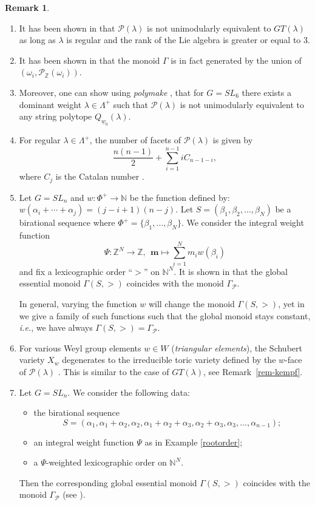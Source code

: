 \documentclass{emsprocart}
\theoremstyle{definition}
\newtheorem{remark}[theorem]{Remark}
\begin{document}
\begin{remark}\label{remark-pbw}
\begin{enumerate}
\item It has been shown in \cite{Fo1} that $\mathcal{P}(\lambda)$ is not unimodularly equivalent to $GT(\lambda)$ as long as 
$\lambda$ is regular and the rank of the Lie algebra is greater or equal to $3$.
\item It has been shown in \cite{FFL2} that the monoid $\Gamma$ is in fact generated by the union of 
$(\omega_i, \mathcal{P}_{\mathbb{Z}}(\omega_i))$.
\item Moreover, one can show using \textit{polymake} \cite{GJ}, that for $G = SL_6$ there exists a 
dominant weight $\lambda \in \Lambda^+$ such that 
$\mathcal{P}(\lambda)$ is not unimodularly equivalent to any string polytope $Q_{{\underline{w}_0}}(\lambda)$.
\item For regular $\lambda \in \Lambda^+$, the number of facets of $\mathcal{P}(\lambda)$ is given by 
$$
\frac{n(n-1)}{2} + \sum_{i=1}^{n-1} {i} C_{n-1-i},
$$ 
where $C_j$ is the Catalan number \cite{Fo1}.
\item 
Let $G=SL_n$ and $w:\Phi^+\rightarrow\mathbb{N}$ be the function defined by: $w(\alpha_i+\cdots+\alpha_j)=(j-i+1)(n-j).$
Let $S=(\beta_1,\beta_2,\ldots,\beta_N)$ be a birational sequence where $\Phi^+=\{\beta_1,\ldots,\beta_N\}$. 
We consider the integral weight function 
$$
\Psi:\mathbb{Z}^N\rightarrow\mathbb{Z},\ \ \mathbf{m}\mapsto \sum_{i=1}^Nm_iw(\beta_i)
$$
and fix a lexicographic order ``$>$'' on $\mathbb{N}^N$. It is shown in \cite{FFR} that the global essential monoid 
$\Gamma(S,>)$ coincides with the monoid $\Gamma_\mathcal{P}$.
\par
In general, varying the function $w$ will change the monoid $\Gamma(S,>)$, yet in \cite{BFF} 
we give a family of such functions such that the global monoid stays constant, \emph{i.e.}, we have always $\Gamma(S,>)=\Gamma_\mathcal{P}$.
\item For various Weyl group elements $w\in W$ (\textit{triangular elements}), the Schubert variety $X_w$ degenerates to the irreducible toric variety defined by the $w$-face of $\mathcal{P}(\lambda)$ \cite{Fo2}.
This is similar to the case of $GT(\lambda)$, see Remark~\ref{rem-kempf}.
\item Let $G=SL_n$. We consider the following data:
\begin{itemize}
\item the birational sequence 
$$
S=(\alpha_1,\alpha_1+\alpha_2,\alpha_2,\alpha_1 + \alpha_2 +\alpha_3,\alpha_2 +\alpha_3,\alpha_3, \ldots,  \alpha_{n-1});
$$
\item an integral weight function $\Psi$ as in Example \ref{rootorder};
\item a $\Psi$-weighted lexicographic order on $\mathbb{N}^N$.
\end{itemize}
Then the corresponding global essential monoid $\Gamma(S,>)$ coincides with the monoid $\Gamma_\mathcal{P}$ (see \cite{FFL2}).
\end{enumerate}
 \end{remark}
\end{document}
